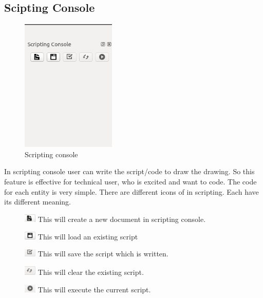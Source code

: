 \subsection{Scipting Console}
\begin{figure}[h!]
\centering
\includegraphics[width=0.4\textwidth]{images/scriptingconsole.png} 
\caption{Scripting console}
\end{figure}
In scripting console user can write the script/code to draw the drawing. So this feature is effective for technical user, who is excited and want to code. The code for each entity is very simple. There are different icons of in scripting. Each have its different meaning.
\begin{figure}[h!]
\includegraphics[width=0.05\textwidth]{images/document.png} 
This will create a new document in scripting console.
\end{figure}
\begin{figure}[h!]
\includegraphics[width=0.05\textwidth]{images/browser.png} 
This will load an existing script
\end{figure}
\begin{figure}[h!]
\includegraphics[width=0.05\textwidth]{images/task.png} 
This will save the script which is written.
\end{figure}
\begin{figure}[h!]
\includegraphics[width=0.05\textwidth]{images/loop-circular.png} 
This will clear the existing script.
\end{figure}
\begin{figure}[h!]
\includegraphics[width=0.05\textwidth]{images/play-circular.png} 
This will execute the current script.
\end{figure}
\newpage
